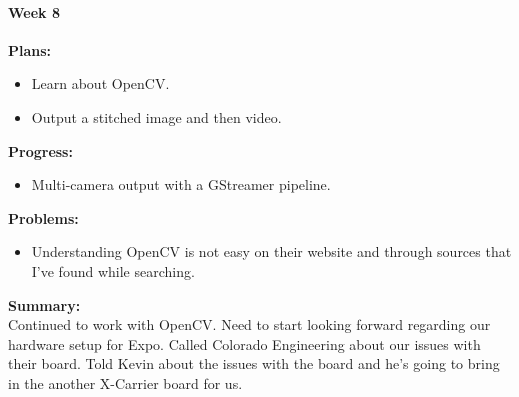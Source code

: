\paragraph{Week 8}
\begin{adjustwidth}{2.5em}{0pt}
    \vspace{-0.5cm}\textbf{Plans:}
    \vspace{-0.5cm}
    \begin{itemize}
        \item Learn about OpenCV.
		\item Output a stitched image and then video.
    \end{itemize} 
    \vspace{-0.3cm}\textbf{Progress:}
    \vspace{-0.5cm}
    \begin{itemize}
        \item Multi-camera output with a GStreamer pipeline. 
    \end{itemize} 
    \vspace{-0.3cm}\textbf{Problems:}
    \vspace{-0.5cm}
    \begin{itemize}
        \item Understanding OpenCV is not easy on their website and through sources that I've found while searching. 
    \end{itemize}  
    \vspace{-0.3cm}\noindent\textbf{Summary:}\\
    \noindent Continued to work with OpenCV. Need to start looking forward regarding our hardware setup for Expo. Called Colorado Engineering about our issues with their board. Told Kevin about the issues with the board and he's going to bring in the another X-Carrier board for us. 
\end{adjustwidth} 


